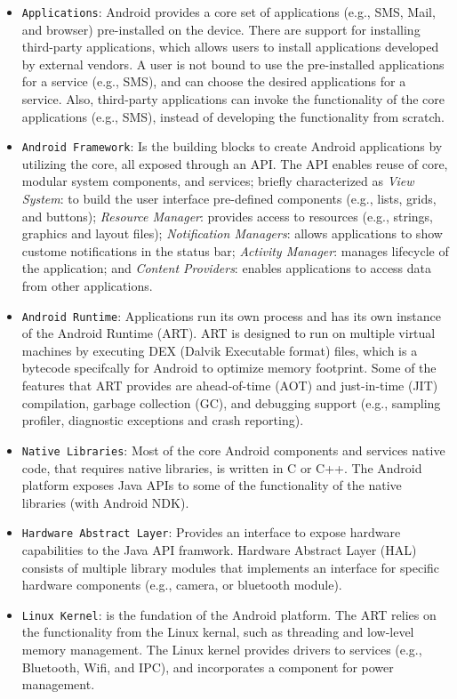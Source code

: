 \begin{itemize}
    \item \verb|Applications|: Android provides a core set of applications (e.g., SMS, Mail, and browser) pre-installed on the device. There are support for installing third-party applications, which allows users to install applications developed by external vendors. A user is not bound to use the pre-installed applications for a service (e.g., SMS), and can choose the desired applications for a service. Also, third-party applications can invoke the functionality of the core applications (e.g., SMS), instead of developing the functionality from scratch. 
    \item \verb|Android Framework|: Is the building blocks to create Android applications by utilizing the core, all exposed through an API. The API enables reuse of core, modular system components, and services; briefly characterized as \textit{View System}: to build the user interface pre-defined components (e.g., lists, grids, and buttons); \textit{Resource Manager}: provides access to resources (e.g., strings, graphics and layout files); \textit{Notification Managers}: allows applications to show custome notifications in the status bar; \textit{Activity Manager}: manages lifecycle of the application; and \textit{Content Providers}: enables applications to access data from other applications.
    \item \verb|Android Runtime|: Applications run its own process and has its own instance of the Android Runtime (ART). ART is designed to run on multiple virtual machines by executing DEX (Dalvik Executable format) files, which is a bytecode specifcally for Android to optimize memory footprint. Some of the features that ART provides are ahead-of-time (AOT) and just-in-time (JIT) compilation, garbage collection (GC), and debugging support (e.g., sampling profiler, diagnostic exceptions and crash reporting).
    \item \verb|Native Libraries|: Most of the core Android components and services native code, that requires native libraries, is written in C or C++. The Android platform exposes Java APIs to some of the functionality of the native libraries (with Android NDK).   
    \item \verb|Hardware Abstract Layer|: Provides an interface to expose hardware capabilities to the Java API framwork. Hardware Abstract Layer (HAL) consists of multiple library modules that implements an interface for specific hardware components (e.g., camera, or bluetooth module).
    \item \verb|Linux Kernel|: is the fundation of the Android platform. The ART relies on the functionality from the Linux kernal, such as threading and low-level memory management. The Linux kernel provides drivers to services (e.g., Bluetooth, Wifi, and IPC), and incorporates a component for power management. 
\end{itemize} 


